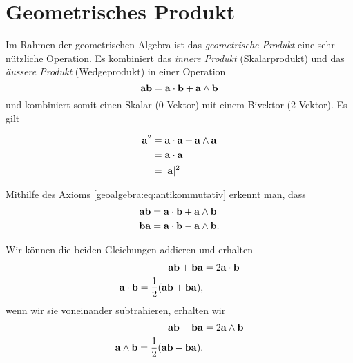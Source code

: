 \section{Geometrisches Produkt}
Im Rahmen der geometrischen Algebra ist das \emph{geometrische Produkt} eine sehr
nützliche Operation. Es kombiniert das \emph{innere Produkt} (Skalarprodukt) und das
\emph{äussere Produkt} (Wedgeprodukt) in einer Operation
\begin{equation}
\mathbf{a} \mathbf{b} = \mathbf{a} \cdot \mathbf{b} + \mathbf{a} \wedge \mathbf{b}
\end{equation}
und kombiniert somit einen Skalar (0-Vektor) mit einem Bivektor (2-Vektor).
Es gilt
\begin{lemma}
\begin{equation}
  \label{geoalgebra:lemma:a_squared}
  \begin{aligned}
    \mathbf{a}^2 &= \mathbf{a} \cdot \mathbf{a} + \mathbf{a} \wedge \mathbf{a} \\
    &= \mathbf{a} \cdot \mathbf{a} \\
    &= |\mathbf{a}|^2
  \end{aligned}
\end{equation}
\end{lemma}
Mithilfe des Axioms \eqref{geoalgebra:eq:antikommutativ} erkennt man, dass
\begin{align}
  \mathbf{a} \mathbf{b} &= \mathbf{a} \cdot \mathbf{b} + \mathbf{a} \wedge \mathbf{b} \\
  \mathbf{b} \mathbf{a} &= \mathbf{a} \cdot \mathbf{b} - \mathbf{a} \wedge \mathbf{b}.
\end{align}

Wir können die beiden Gleichungen addieren und erhalten
\begin{align}
  \mathbf{a} \mathbf{b} + \mathbf{b} \mathbf{a} &= 2 \mathbf{a} \cdot \mathbf{b} \\
  \mathbf{a} \cdot \mathbf{b} = \frac{1}{2} (\mathbf{a} \mathbf{b} + \mathbf{b} \mathbf{a}),
\end{align}
wenn wir sie voneinander subtrahieren, erhalten wir
\begin{align}
  \mathbf{a} \mathbf{b} - \mathbf{b} \mathbf{a} &= 2 \mathbf{a} \wedge \mathbf{b} \\
  \mathbf{a} \wedge \mathbf{b} = \frac{1}{2} (\mathbf{a} \mathbf{b} - \mathbf{b} \mathbf{a}).
\end{align}
